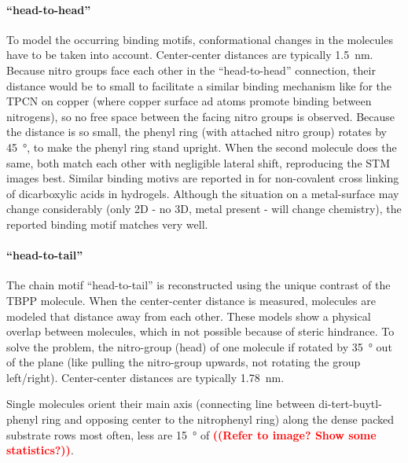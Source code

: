 	\paragraph{``head-to-head''}
	To model the occurring binding motifs, conformational changes in the molecules have to be taken into account. Center-center distances are typically \SI{1.5}{\nano \meter}. Because nitro groups face each other in the ``head-to-head'' connection, their distance would be to small to facilitate a similar binding mechanism like for the TPCN on copper (where copper surface ad atoms promote binding between nitrogens), so no free space between the facing nitro groups is observed. Because the distance is so small, the phenyl ring (with attached nitro group) rotates by \SI{45}{\degree}, to make the phenyl ring stand upright. When the second molecule does the same, both match each other with negligible lateral shift, reproducing the STM images best. Similar binding motivs are reported in \cite{kato_dispersive_2008} for non-covalent cross linking of dicarboxylic acids in hydrogels. Although the situation on a metal-surface may change considerably (only 2D - no 3D, metal present - will change chemistry), the reported binding motif matches very well.  
	
	\paragraph{``head-to-tail''}
	The chain motif ``head-to-tail'' is reconstructed using the unique contrast of the TBPP molecule. When the center-center distance is measured, molecules are modeled that distance away from each other. These models show a physical overlap between molecules, which in not possible because of steric hindrance. To solve the problem, the nitro-group (head) of one molecule if rotated by \SI{35}{\degree} out of the plane (like pulling the nitro-group upwards, not rotating the group left/right). Center-center distances are typically \SI{1.78}{\nano \meter}.
	

Single molecules orient their main axis (connecting line between di-tert-buytl-phenyl ring and opposing center to the nitrophenyl ring) along the dense packed substrate rows most often, less are \SI{15}{\degree} of \textcolor{red}{\textbf{((Refer to image? Show some statistics?))}}.
	
